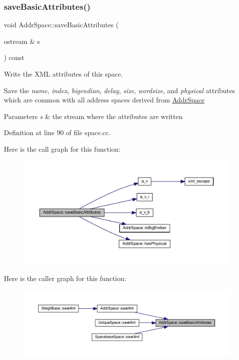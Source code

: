 \subsubsection{\texorpdfstring{saveBasicAttributes()}{saveBasicAttributes()}}
{\footnotesize\ttfamily void Addr\+Space\+::save\+Basic\+Attributes (\begin{DoxyParamCaption}\item[{ostream \&}]{s }\end{DoxyParamCaption}) const\hspace{0.3cm}{\ttfamily [protected]}}



Write the X\+ML attributes of this space. 

Save the {\itshape name}, {\itshape index}, {\itshape bigendian}, {\itshape delay}, {\itshape size}, {\itshape wordsize}, and {\itshape physical} attributes which are common with all address spaces derived from \mbox{\hyperlink{class_addr_space}{Addr\+Space}} 
\begin{DoxyParams}{Parameters}
{\em s} & the stream where the attributes are written \\
\hline
\end{DoxyParams}


Definition at line 90 of file space.\+cc.

Here is the call graph for this function\+:
\nopagebreak
\begin{figure}[H]
\begin{center}
\leavevmode
\includegraphics[width=350pt]{class_addr_space_a7acbe22e2d26a7e70ef09fdfa646e9af_cgraph}
\end{center}
\end{figure}
Here is the caller graph for this function\+:
\nopagebreak
\begin{figure}[H]
\begin{center}
\leavevmode
\includegraphics[width=350pt]{class_addr_space_a7acbe22e2d26a7e70ef09fdfa646e9af_icgraph}
\end{center}
\end{figure}
\mbox{\label{class_addr_space_ac073a4d446677c54d769abba01318864}} 
